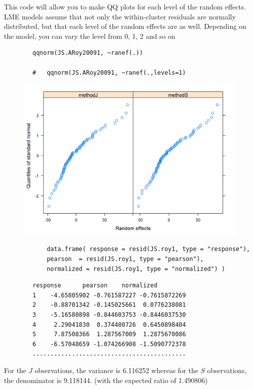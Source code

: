 \documentclass[12pt, a4paper]{report}
\theoremstyle{plain}
\theoremstyle{definition}
\theoremstyle{remark}
\begin{document}
	This code will allow you to make QQ plots for each level of the random effects.  LME models assume that not only the within-cluster residuals are normally distributed, but that each level of the random effects are as well. Depending on the model, you can vary the level from 0, 1, 2 and so on
	\begin{framed}
		\begin{verbatim}
		qqnorm(JS.ARoy20091, ~ranef(.))
		
		# 	qqnorm(JS.ARoy20091, ~ranef(.,levels=1)
		\end{verbatim}
	\end{framed}
	\begin{figure}[h!]
		\centering
		\includegraphics[width=0.9\linewidth]{images/ResidPlot2}
		\caption{}
		\label{fig:ResidPlot2}
	\end{figure}	
	
		
		\begin{framed}
			\begin{verbatim}
			data.frame( response = resid(JS.roy1, type = "response"), 
			pearson  = resid(JS.roy1, type = "pearson"), 
			normalized = resid(JS.roy1, type = "normalized") )
			\end{verbatim}
		\end{framed}
		
		\begin{verbatim}
		response      pearson    normalized
		1    -4.65805902 -0.761587227 -0.7615872269
		2    -0.88701342 -0.145025661  0.0776238081
		3    -5.16580898 -0.844603753 -0.8446037530
		4     2.29041830  0.374480726  0.6450898404
		5     7.87508366  1.287567009  1.2875670086
		6    -6.57048659 -1.074266908 -1.5090772378
		...........................................
		\end{verbatim}
		For the $J$ observations, the variance is 6.116252 whereas for the $S$ observations, the denominator is 9.118144. (with the expected ratio of  1.490806)
		
\end{document}
